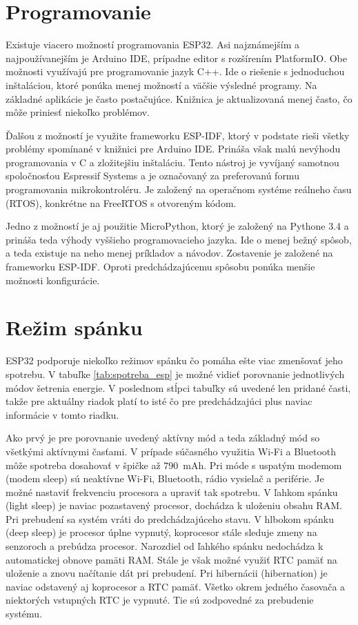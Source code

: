 \section{Programovanie}

Existuje viacero možností programovania ESP32. Asi najznámejším a najpoužívanejším je Arduino IDE, prípadne editor s rozšírením PlatformIO. Obe možnosti využívajú pre programovanie jazyk C++. Ide o riešenie s jednoduchou inštaláciou, ktoré ponúka menej možností a väčšie výsledné programy. Na základné aplikácie je často postačujúce. Knižnica je aktualizovaná menej často, čo môže priniesť niekoľko problémov.

Ďalšou z možností je využite frameworku ESP-IDF, ktorý v podstate rieši všetky problémy spomínané v knižnici pre Arduino IDE. Prináša však malú nevýhodu programovania v C a zložitejšiu inštaláciu. Tento nástroj je vyvíjaný samotnou spoločnosťou Espressif Systems a je označovaný za preferovanú formu programovania mikrokontroléru. Je založený na operačnom systéme reálneho času (RTOS), konkrétne na FreeRTOS s otvoreným kódom.

Jedno z možností je aj použitie MicroPython, ktorý je založený na Pythone 3.4 a prináša teda výhody vyššieho programovacieho jazyka. Ide o menej bežný spôsob, a teda existuje na neho menej príkladov a návodov. Zostavenie je založené na frameworku ESP-IDF. Oproti predchádzajúcemu spôsobu ponúka menšie možnosti konfigurácie.

\section{Režim spánku}\label{sec:esp-sleep}

ESP32 podporuje niekoľko režimov spánku čo pomáha ešte viac zmenšovať jeho spotrebu. V tabuľke \ref{tab:spotreba_esp} je možné vidieť porovnanie jednotlivých módov šetrenia energie. V poslednom stĺpci tabuľky sú uvedené len pridané časti, takže pre aktuálny riadok platí to isté čo pre predchádzajúci plus naviac informácie v tomto riadku.

Ako prvý je pre porovnanie uvedený aktívny mód a teda základný mód so všetkými aktívnymi časťami. V prípade súčasného využitia Wi-Fi a Bluetooth môže spotreba dosahovať v špičke až 790~mAh. Pri móde s uspatým modemom (modem sleep) sú neaktívne Wi-Fi, Bluetooth, rádio vysielač a periférie. Je možné nastaviť frekvenciu procesora a upraviť tak spotrebu. V ľahkom spánku (light sleep) je naviac pozastavený procesor, dochádza k uloženiu obsahu RAM. Pri prebudení sa systém vráti do predchádzajúceho stavu. V hlbokom spánku (deep sleep) je procesor úplne vypnutý, koprocesor stále sleduje zmeny na senzoroch a prebúdza procesor. Narozdiel od ľahkého spánku nedochádza k automatickej obnove pamäti RAM. Stále je však možné využiť RTC pamäť na uloženie a znovu načítanie dát pri prebudení. Pri hibernácii (hibernation) je naviac odstavený aj koprocesor a RTC pamäť. Všetko okrem jedného časovača a niektorých vstupných RTC je vypnuté. Tie sú zodpovedné za prebudenie systému.\cite{esp-sleep}

